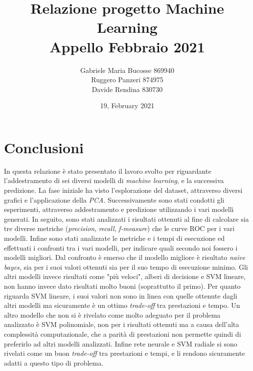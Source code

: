 \documentclass[a4paper, 12pt]{article}
\title{Relazione progetto Machine Learning \\
    \large Appello Febbraio 2021}
\author{Gabriele Maria Bucosse 869940 \\ Ruggero Panzeri 874975\\ Davide Rendina 830730}
\date{19, February 2021}
\begin{document}
\newcommand{\imagespace}{\vspace{0.4cm}}

\maketitle

\newpage

\tableofcontents

\newpage





\newpage


\newpage
\section{Conclusioni}
    In questa relazione è stato presentato il lavoro svolto per riguardante l'addestramento di sei diversi modelli di \textit{machine learning}, e la successiva predizione. La fase iniziale ha visto l'esplorazione del dataset, attraverso diversi grafici e l'applicazione della \textit{PCA}. Successivamente sono stati condotti gli esperimenti, attraverso addestramento e predizione utilizzando i vari modelli generati. In seguito, sono stati analizzati i risultati ottenuti al fine di calcolare sia tre diverse metriche (\textit{precision}, \textit{recall}, \textit{f-measure}) che le curve ROC per i vari modelli. Infine sono stati analizzate le metriche e i tempi di esecuzione ed effettuati i confronti tra i vari modelli, per indicare quali secondo noi fossero i modelli migliori. Dal confronto è emerso che il modello migliore è risultato \textit{naive bayes}, sia per i suoi valori ottenuti sia per il suo tempo di esecuzione minimo. Gli altri modelli invece risultati come "più veloci", alberi di decisione e SVM lineare, non hanno invece dato risultati molto buoni (soprattutto il primo). Per quanto riguarda SVM lineare, i suoi valori non sono in linea con quelle ottenute dagli altri modelli ma sicuramente è un ottimo \textit{trade-off} tra prestazioni e tempo. Un altro modello che non si è rivelato come molto adeguato per il problema analizzato è SVM polinomiale, non per i risultati ottenuti ma a causa dell'alta complessità computazionale, che a parità di prestazioni non permette quindi di preferirlo ad altri modelli analizzati. Infine rete neurale e SVM radiale si sono rivelati come un buon \textit{trade-off} tra prestazioni e tempi, e li rendono sicuramente adatti a questo tipo di problema.
    





    
\end{document}
